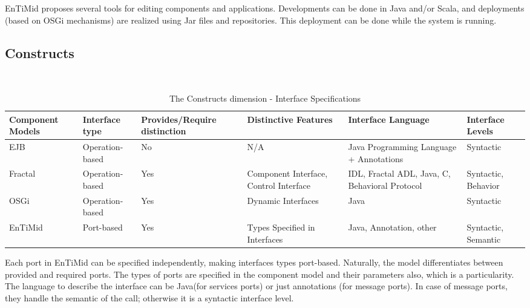 EnTiMid proposes several tools for editing components and applications. Developments can be done in Java and/or Scala, and deployments (based on OSGi mechanisms) are realized using Jar files and repositories. This deployment can be done while the system is running.

\subsection{Constructs}
~
\vspace{-0,5cm}
\begin{table}[h!]
\centering
{\scriptsize 
\begin{tabular}{|>{\centering}m{}|| >{\centering}m{}| >{\centering}m{}| >{\centering}m{}| >{\centering}m{}| >{\centering\arraybackslash}m{}|}
\hline
Component Models & Interface type & Provides/Require distinction & Distinctive Features & Interface Language & Interface Levels \\
\hline
EJB & Operation-based & No & N/A & Java Programming Language + Annotations & Syntactic \\
\hline
Fractal & Operation-based & Yes & Component Interface, Control Interface & IDL, Fractal ADL, Java, C, Behavioral Protocol & Syntactic, Behavior \\
\hline
OSGi & Operation-based & Yes & Dynamic Interfaces & Java & Syntactic \\
\hline\hline
EnTiMid & Port-based & Yes & Types Specified in Interfaces & Java, Annotation, other & Syntactic, Semantic \\
\hline
\end{tabular}
}
\caption{The Constructs dimension - Interface Specifications}
\label{table:classifConstIface}
\end{table}

Each port in EnTiMid can be specified independently, making interfaces types port-based. Naturally, the model differentiates between provided and required ports. The types of ports are specified in the component model and their parameters also, which is a particularity. The language to describe the interface can be Java(for services ports) or just annotations (for message ports). In case of message ports, they handle the semantic of the call; otherwise it is a syntactic interface level.

